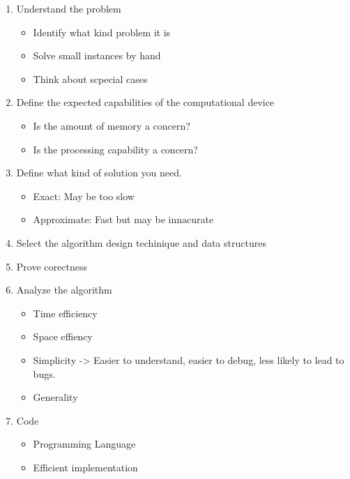 \documentclass{article}
\begin{document}
\begin{enumerate}
    \begin{enumerate}
        \item Understand the problem 
        \begin{itemize}
            \item Identify what kind problem it is
            \item Solve small instances by hand 
            \item Think about scpecial cases
        \end{itemize}


        \item Define the expected capabilities of the computational device
        \begin{itemize}
            \item Is the amount of memory a concern?
            \item Is the processing capability a concern?
        \end{itemize}
    

        \item Define what kind of solution you need.
        \begin{itemize}
            \item Exact: May be too slow
            \item Approximate: Fast but may be innacurate
        \end{itemize}

        \item Select the algorithm design techinique and data structures
    
        \item Prove corectness
        
        \item Analyze the algorithm
        \begin{itemize}
            \item Time efficiency
            \item Space effiency
            \item Simplicity -> Easier to understand, easier to debug, less likely to lead to bugs.
            \item Generality
        \end{itemize}
            
        \item Code
        \begin{itemize}
            \item Programming Language
            \item Efficient implementation
        \end{itemize}
            

\end{enumerate}
\end{enumerate}
\end{document}
